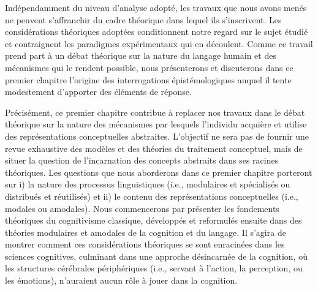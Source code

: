 \documentclass[
  a4paper,12pt,twoside,onecolumn,openright,final,oldfontcommands]{memoir}
\begin{document}
Indépendamment du niveau d'analyse adopté, les travaux que nous avons menés ne peuvent s'affranchir du cadre théorique dans lequel ils s'inscrivent. Les considérations théoriques adoptées conditionnent notre regard sur le sujet étudié et contraignent les paradigmes expérimentaux qui en découlent. Comme ce travail prend part à un débat théorique sur la nature du langage humain et des mécanismes qui le rendent possible, nous présenterons et discuterons dans ce premier chapitre l'origine des interrogations épistémologiques auquel il tente modestement d'apporter des éléments de réponse.

Précisément, ce premier chapitre contribue à replacer nos travaux dans le débat théorique sur la nature des mécanismes par lesquels l'individu acquière et utilise des représentations conceptuelles abstraites. L'objectif ne sera pas de fournir une revue exhaustive des modèles et des théories du traitement conceptuel, mais de situer la question de l'incarnation des concepts abstraits dans ses racines théoriques. Les questions que nous aborderons dans ce premier chapitre porteront sur i) la nature des processus linguistiques (i.e., modulaires et spécialisés ou distribués et réutilisés) et ii) le contenu des représentations conceptuelles (i.e., modales ou amodales). Nous commencerons par présenter les fondements théoriques du cognitivisme classique, développés et reformulés ensuite dans des théories modulaires et amodales de la cognition et du langage. Il s'agira de montrer comment ces considérations théoriques se sont enracinées dans les sciences cognitives, culminant dans une approche désincarnée de la cognition, où les structures cérébrales périphériques (i.e., servant à l'action, la perception, ou les émotions), n'auraient aucun rôle à jouer dans la cognition.
\end{document}
